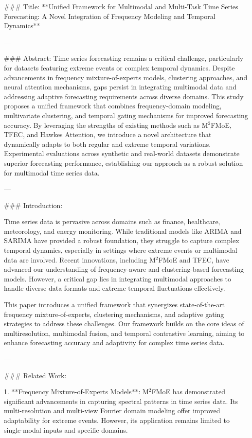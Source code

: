 ### Title:
**Unified Framework for Multimodal and Multi-Task Time Series Forecasting: A Novel Integration of Frequency Modeling and Temporal Dynamics**

---

### Abstract:
Time series forecasting remains a critical challenge, particularly for datasets featuring extreme events or complex temporal dynamics. Despite advancements in frequency mixture-of-experts models, clustering approaches, and neural attention mechanisms, gaps persist in integrating multimodal data and addressing adaptive forecasting requirements across diverse domains. This study proposes a unified framework that combines frequency-domain modeling, multivariate clustering, and temporal gating mechanisms for improved forecasting accuracy. By leveraging the strengths of existing methods such as M$^2$FMoE, TFEC, and Hawkes Attention, we introduce a novel architecture that dynamically adapts to both regular and extreme temporal variations. Experimental evaluations across synthetic and real-world datasets demonstrate superior forecasting performance, establishing our approach as a robust solution for multimodal time series data.

---

### Introduction:

Time series data is pervasive across domains such as finance, healthcare, meteorology, and energy monitoring. While traditional models like ARIMA and SARIMA have provided a robust foundation, they struggle to capture complex temporal dynamics, especially in settings where extreme events or multimodal data are involved. Recent innovations, including M$^2$FMoE and TFEC, have advanced our understanding of frequency-aware and clustering-based forecasting models. However, a critical gap lies in integrating multimodal approaches to handle diverse data formats and extreme temporal fluctuations effectively.

This paper introduces a unified framework that synergizes state-of-the-art frequency mixture-of-experts, clustering mechanisms, and adaptive gating strategies to address these challenges. Our framework builds on the core ideas of multiresolution, multimodal fusion, and temporal contrastive learning, aiming to enhance forecasting accuracy and adaptivity for complex time series data.

---

### Related Work:

1. **Frequency Mixture-of-Experts Models**: M$^2$FMoE has demonstrated significant advancements in capturing spectral patterns in time series data. Its multi-resolution and multi-view Fourier domain modeling offer improved adaptability for extreme events. However, its application remains limited to single-modal inputs and specific domains.

